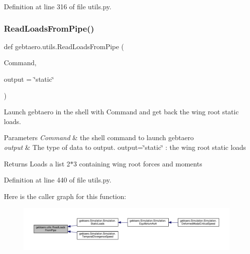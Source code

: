 Definition at line 316 of file utils.\+py.

\mbox{\label{namespacegebtaero_1_1utils_ad2812937cff40c12f0af963ab0b429b6}} 
\subsubsection{\texorpdfstring{Read\+Loads\+From\+Pipe()}{ReadLoadsFromPipe()}}
{\footnotesize\ttfamily def gebtaero.\+utils.\+Read\+Loads\+From\+Pipe (\begin{DoxyParamCaption}\item[{}]{Command,  }\item[{}]{output = {\ttfamily \char`\"{}static\char`\"{}} }\end{DoxyParamCaption})}



Launch gebtaero in the shell with Command and get back the wing root static loads. 


\begin{DoxyParams}{Parameters}
{\em Command} & the shell command to launch gebtaero \\
\hline
{\em output} & The type of data to output. output=\char`\"{}static\char`\"{} \+: the wing root static loads \\
\hline
\end{DoxyParams}
\begin{DoxyReturn}{Returns}
Loads a list 2$\ast$3 containing wing root forces and moments 
\end{DoxyReturn}


Definition at line 440 of file utils.\+py.

Here is the caller graph for this function\+:
\nopagebreak
\begin{figure}[H]
\begin{center}
\leavevmode
\includegraphics[width=350pt]{namespacegebtaero_1_1utils_ad2812937cff40c12f0af963ab0b429b6_icgraph}
\end{center}
\end{figure}
\mbox{\label{namespacegebtaero_1_1utils_a79bf2fa9cdad677abf70cacde7abcf9e}} 
